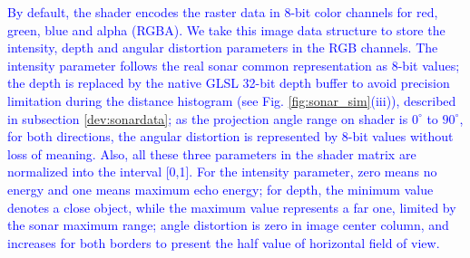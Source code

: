 \documentclass[final,5p,times]{elsarticle}
\begin{document}
\textcolor{blue}{By default, the shader encodes the raster data in 8-bit color channels for red, green, blue and alpha (RGBA). We take this image data structure to store the intensity, depth and angular distortion parameters in the RGB channels. The intensity parameter follows the real sonar common representation as 8-bit values; the depth is replaced by the native GLSL 32-bit depth buffer to avoid precision limitation during the distance histogram (see Fig. \ref{fig:sonar_sim}(iii)), described in subsection \ref{dev:sonardata}; as the projection angle range on shader is $0^{\circ}$ to $90^{\circ}$, for both directions, the angular distortion is represented by 8-bit values without loss of meaning. Also, all these three parameters in the shader matrix are normalized into the interval [0,1]. For the intensity parameter, zero means no energy and one means maximum echo energy; for depth, the minimum value denotes a close object, while the maximum value represents a far one, limited by the sonar maximum range; angle distortion is zero in image center column, and increases for both borders to present the half value of horizontal field of view.}
\end{document}
